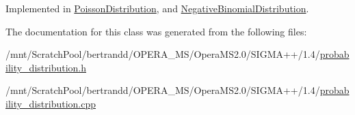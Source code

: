 Implemented in \hyperlink{classPoissonDistribution_ae4bb9a4af35078b03fdf3778644d529d}{PoissonDistribution}, and \hyperlink{classNegativeBinomialDistribution_ad609aa4b6b7b3270e5e73a45a49ceb74}{NegativeBinomialDistribution}.

The documentation for this class was generated from the following files:\begin{DoxyCompactItemize}
\item 
/mnt/ScratchPool/bertrandd/OPERA\_\-MS/OperaMS2.0/SIGMA++/1.4/\hyperlink{probability__distribution_8h}{probability\_\-distribution.h}\item 
/mnt/ScratchPool/bertrandd/OPERA\_\-MS/OperaMS2.0/SIGMA++/1.4/\hyperlink{probability__distribution_8cpp}{probability\_\-distribution.cpp}\end{DoxyCompactItemize}
